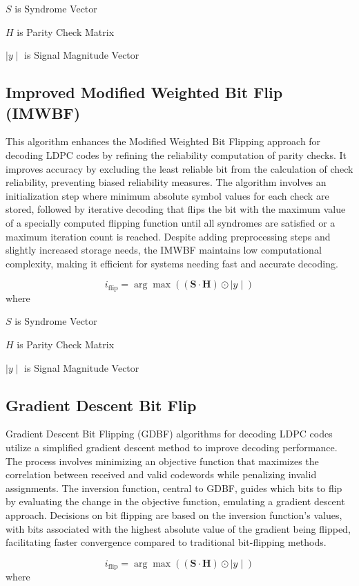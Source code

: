 \documentclass[a4paper,conference]{IEEEtran}
\begin{document}
\( S \) is Syndrome Vector

\( H \) is Parity Check Matrix

\( \mid y\mid  \) is Signal Magnitude Vector
\subsection{Improved Modified Weighted Bit Flip (IMWBF)}
This algorithm enhances the Modified Weighted Bit Flipping approach for decoding LDPC codes by refining the reliability computation of parity checks. It improves accuracy by excluding the least reliable bit from the calculation of check reliability, preventing biased reliability measures. The algorithm involves an initialization step where minimum absolute symbol values for each check are stored, followed by iterative decoding that flips the bit with the maximum value of a specially computed flipping function until all syndromes are satisfied or a maximum iteration count is reached. Despite adding preprocessing steps and slightly increased storage needs, the IMWBF maintains low computational complexity, making it efficient for systems needing fast and accurate decoding.


\[
i_{\text{flip}} = \arg\max ( ( \mathbf{S} \cdot \mathbf{H} ) \odot \mid y\mid  )
\]
where 

\( S \) is Syndrome Vector

\( H \) is Parity Check Matrix

\( \mid y\mid  \) is Signal Magnitude Vector

\subsection{Gradient Descent Bit Flip}
Gradient Descent Bit Flipping (GDBF) algorithms for decoding LDPC codes utilize a simplified gradient descent method to improve decoding performance. The process involves minimizing an objective function that maximizes the correlation between received and valid codewords while penalizing invalid assignments. The inversion function, central to GDBF, guides which bits to flip by evaluating the change in the objective function, emulating a gradient descent approach. Decisions on bit flipping are based on the inversion function's values, with bits associated with the highest absolute value of the gradient being flipped, facilitating faster convergence compared to traditional bit-flipping methods.

\[
i_{\text{flip}} = \arg\max ( ( \mathbf{S} \cdot \mathbf{H} ) \odot \mid y\mid  )
\]
where 
\end{document}
